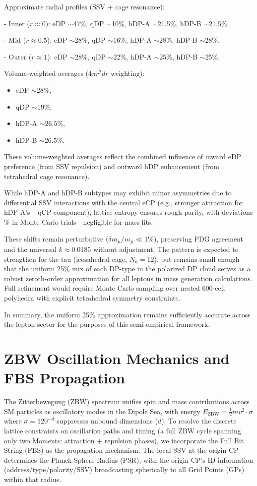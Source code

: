 \documentclass{article}
\begin{document}
Approximate radial profiles (SSV + cage resonance):

- Inner ($r \approx 0$): eDP $\sim$47\%, qDP $\sim$10\%, hDP-A $\sim$21.5\%, hDP-B $\sim$21.5\%.

- Mid ($r \approx 0.5$): eDP $\sim$28\%, qDP $\sim$16\%, hDP-A $\sim$28\%, hDP-B $\sim$28\%.

- Outer ($r \approx 1$): eDP $\sim$28\%, qDP $\sim$22\%, hDP-A $\sim$25\%, hDP-B $\sim$25\%.

Volume-weighted averages ($4\pi r^2 dr$ weighting):
\begin{itemize}
    \item eDP $\sim 28\%$,
    \item qDP $\sim 19\%$,
    \item hDP-A $\sim 26.5\%$,
    \item hDP-B $\sim 26.5\%$.
\end{itemize}

These volume-weighted averages reflect the combined influence of inward eDP preference (from SSV repulsion) and outward hDP enhancement (from tetrahedral cage resonance).

While hDP-A and hDP-B subtypes may exhibit minor asymmetries due to differential SSV interactions with the central eCP (e.g., stronger attraction for hDP-A's +qCP component), lattice entropy ensures rough parity, with deviations \% in Monte Carlo trials—negligible for mass fits.

These shifts remain perturbative ($\delta m_\mu / m_\mu \ll 1\%$), preserving PDG agreement and the universal $k \approx 0.0185$ without adjustment. The pattern is expected to strengthen for the tau (icosahedral cage, $N_k = 12$), but remains small enough that the uniform 25\% mix of each DP-type in the polarized DP cloud serves as a robust zeroth-order approximation for all leptons in mass generation calculations. Full refinement would require Monte Carlo sampling over nested 600-cell polyhedra with explicit tetrahedral symmetry constraints. 

In summary, the uniform 25\% approximation remains sufficiently accurate across the lepton sector for the purposes of this semi-empirical framework.

\section{ZBW Oscillation Mechanics and FBS Propagation} 

The Zitterbewegung (ZBW) spectrum unifies spin and mass contributions across SM particles as oscillatory modes in the Dipole Sea, with energy $E_{\text{ZBW}} = \frac{1}{2} m v^2 \cdot \sigma$ where $\sigma = 120^{-d}$ suppresses unbound dimensions ($d$). To resolve the discrete lattice constraints on oscillation paths and timing (a full ZBW cycle spanning only two Moments: attraction + repulsion phases), we incorporate the Full Bit String (FBS) as the propagation mechanism. The local SSV at the origin CP determines the Planck Sphere Radius (PSR), with the origin CP's ID information (address/type/polarity/SSV) broadcasting spherically to all Grid Points (GPs) within that radius.
\end{document}
